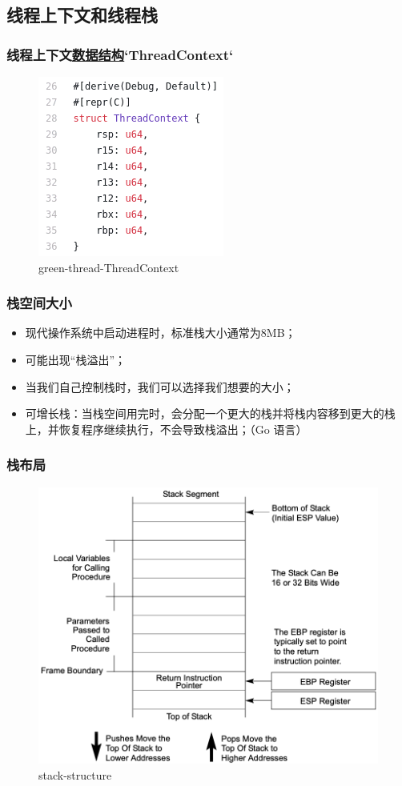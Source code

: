 \subsection{线程上下文和线程栈}
\begin{frame}[fragile]
    \frametitle{线程上下文\href{https://github.com/cfsamson/example-greenthreads/blob/master/src/main.rs\#L28}{数据结构}`ThreadContext`}
% 
	\begin{figure}
		\centering
		\includegraphics[width=0.5\linewidth]{figs/green-thread-ThreadContext.png}
		\caption{green-thread-ThreadContext}
	\end{figure}


% 
\end{frame}
\begin{frame}[fragile]
    \frametitle{栈空间大小}
    \begin{itemize}
        \item 现代操作系统中启动进程时，标准栈大小通常为8MB；
        \item 可能出现“栈溢出”；
        \item 当我们自己控制栈时，我们可以选择我们想要的大小；
        \item 可增长栈：当栈空间用完时，会分配一个更大的栈并将栈内容移到更大的栈上，并恢复程序继续执行，不会导致栈溢出；（Go 语言）
    \end{itemize}
% 
% 
% 
\end{frame}
\begin{frame}[fragile]
    \frametitle{栈布局}
% 
% 
	\begin{figure}
		\centering
		\includegraphics[width=0.5\linewidth]{figs/stack-structure.png}
		\caption{stack-structure}
	\end{figure}


% 
% 
% 
\end{frame}
